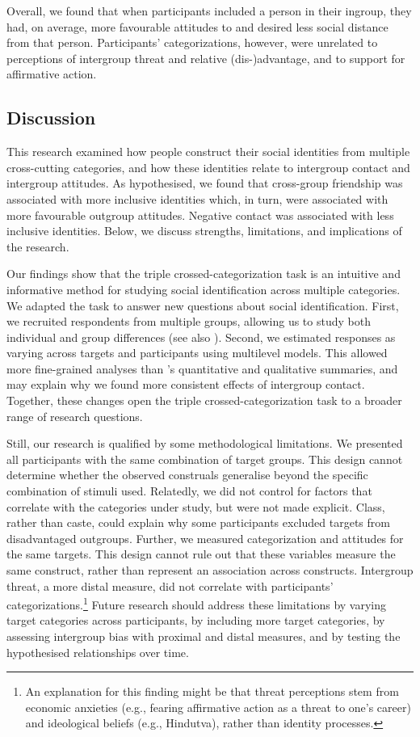 \documentclass[12pt, a4paper]{article}
\begin{document}
Overall, we found that when participants included a person in their ingroup, they had, on average, more favourable attitudes to and desired less social distance from that person. Participants' categorizations, however, were unrelated to perceptions of intergroup threat and relative (dis-)advantage, and to support for affirmative action.

\subsection{Discussion}

This research examined how people construct their social identities from multiple cross-cutting categories, and how these identities relate to intergroup contact and intergroup attitudes. As hypothesised, we found that cross-group friendship was associated with more inclusive identities which, in turn, were associated with more favourable outgroup attitudes. Negative contact was associated with less inclusive identities. Below, we discuss strengths, limitations, and implications of the research.

Our findings show that the triple crossed-categorization task \cite{dommelen_construing_2015} is an intuitive and informative method for studying social identification across multiple categories. We adapted the task to answer new questions about social identification. First, we recruited respondents from multiple groups, allowing us to study both individual and group differences (see also ). Second, we estimated responses as varying across targets and participants using multilevel models. This allowed more fine-grained analyses than \citeauthor{dommelen_construing_2015}’s quantitative and qualitative summaries, and may explain why we found more consistent effects of intergroup contact. Together, these changes open the triple crossed-categorization task to a broader range of research questions.

Still, our research is qualified by some methodological limitations. We presented all participants with the same combination of target groups. This design cannot determine whether the observed construals generalise beyond the specific combination of stimuli used. Relatedly, we did not control for factors that correlate with the categories under study, but were not made explicit. Class, rather than caste, could explain why some participants excluded targets from disadvantaged outgroups. Further, we measured categorization and attitudes for the same targets. This design cannot rule out that these variables measure the same construct, rather than represent an association across constructs. Intergroup threat, a more distal measure, did not correlate with participants' categorizations.\footnote{An explanation for this finding might be that threat perceptions stem from economic anxieties (e.g., fearing affirmative action as a threat to one's career) and ideological beliefs (e.g., Hindutva), rather than identity processes.} Future research should address these limitations by varying target categories across participants, by including more target categories, by assessing intergroup bias with proximal and distal measures, and by testing the hypothesised relationships over time.
\end{document}
